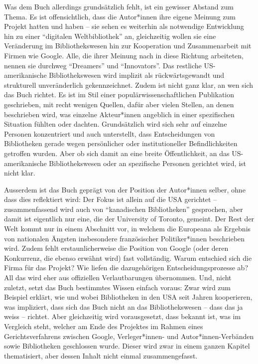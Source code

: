 \documentclass[a4paper,
fontsize=11pt,
oneside,
numbers=noperiodatend,
parskip=half-,
bibliography=totoc,
final
]{scrartcl}
\begin{document}
Was dem Buch allerdings grundsätzlich fehlt, ist ein gewisser Abstand
zum Thema. Es ist offensichtlich, dass die Autor*innen ihre eigene
Meinung zum Projekt hatten und haben -- sie sehen es weiterhin als
notwendige Entwicklung hin zu einer \enquote{digitalen Weltbibliothek}
an, gleichzeitig wollen sie eine Veränderung im Bibliothekswesen hin zur
Kooperation und Zusammenarbeit mit Firmen wie Google. Alle, die ihrer
Meinung nach in diese Richtung arbeiteten, nennen sie durchweg
\enquote{Dreamers} und \enquote{Innovators}. Das restliche
US-amerikanische Bibliothekswesen wird implizit als rückwärtsgewandt und
strukturell unveränderlich gekennzeichnet. Zudem ist nicht ganz klar, an
wen sich das Buch richtet. Es ist im Stil einer
populärwissenschaftlichen Publikation geschrieben, mit recht wenigen
Quellen, dafür aber vielen Stellen, an denen beschrieben wird, was
einzelne Akteur*innen angeblich in einer spezifischen Situation fühlten
oder dachten. Grundsätzlich wird sich sehr auf einzelne Personen
konzentriert und auch unterstellt, dass Entscheidungen von Bibliotheken
gerade wegen persönlicher oder institutioneller Befindlichkeiten
getroffen wurden. Aber ob sich damit an eine breite Öffentlichkeit, an
das US-amerikanische Bibliothekswesen oder an spezifische Personen
gerichtet wird, ist nicht klar.

Ausserdem ist das Buch geprägt von der Position der Autor*innen selber,
ohne dass dies reflektiert wird: Der Fokus ist allein auf die USA
gerichtet -- zusammenfassend wird auch von \enquote{kanadischen
Bibliotheken} gesprochen, aber damit ist eigentlich nur eine, die der
University of Toronto, gemeint. Der Rest der Welt kommt nur in einem
Abschnitt vor, in welchem die Europeana als Ergebnis von nationalen
Ängsten insbesondere französischer Politiker*innen beschrieben wird.
Zudem fehlt erstaunlicherweise die Position von Google (oder deren
Konkurrenz, die ebenso erwähnt wird) fast vollständig. Warum entschied
sich die Firma für das Projekt? Wie liefen die dazugehörigen
Entscheidungsprozesse ab? All das wird eher aus offiziellen
Verlautbarungen übernommen. Und, nicht zuletzt, setzt das Buch
bestimmtes Wissen einfach voraus: Zwar wird zum Beispiel erklärt, wie
und wobei Bibliotheken in den USA seit Jahren kooperieren, was
impliziert, dass sich das Buch nicht an das Bibliothekswesen -- dass das
ja weiss -- richtet. Aber gleichzeitig wird vorausgesetzt, dass bekannt
ist, was im Vergleich steht, welcher am Ende des Projektes im Rahmen
eines Gerichtsverfahrens zwischen Google, Verleger*innen- und
Autor*innen-Verbänden sowie Bibliotheken geschlossen wurde. Dieser wird
zwar in einem ganzen Kapitel thematisiert, aber dessen Inhalt nicht
einmal zusammengefasst.
\end{document}
